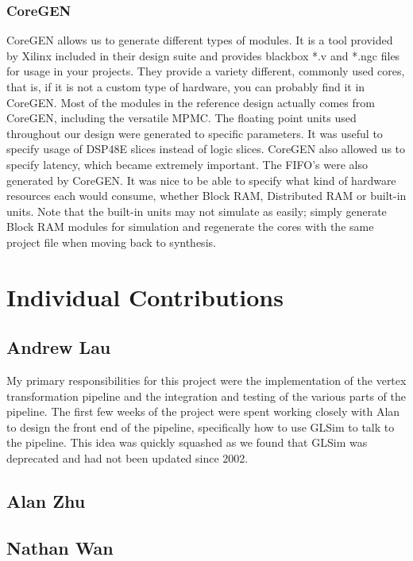 \documentclass[letterpaper,10pt]{article}
\begin{document}
\subsubsection{CoreGEN}
CoreGEN allows us to generate different types of modules.  It is a tool provided by Xilinx included in their design suite and provides blackbox *.v and *.ngc files for usage in your projects.  They provide a variety different, commonly used cores, that is, if it is not a custom type of hardware, you can probably find it in CoreGEN.  Most of the modules in the reference design actually comes from CoreGEN, including the versatile MPMC.  The floating point units used throughout our design were generated to specific parameters.  It was useful to specify usage of DSP48E slices instead of logic slices.  CoreGEN also allowed us to specify latency, which became extremely important.  The FIFO's were also generated by CoreGEN.  It was nice to be able to specify what kind of hardware resources each would consume, whether Block RAM, Distributed RAM or built-in units.  Note that the built-in units may not simulate as easily; simply generate Block RAM modules for simulation and regenerate the cores with the same project file when moving back to synthesis.


\section{Individual Contributions}
\subsection{Andrew Lau}
My primary responsibilities for this project were the implementation of the vertex transformation pipeline and the integration and testing of the various parts of the pipeline. The first few weeks of the project were spent working closely with Alan to design the front end of the pipeline, specifically how to use GLSim to talk to the pipeline. This idea was quickly squashed as we found that GLSim was deprecated and had not been updated since 2002. \\

\subsection{Alan Zhu}
\subsection{Nathan Wan}
\end{document}
